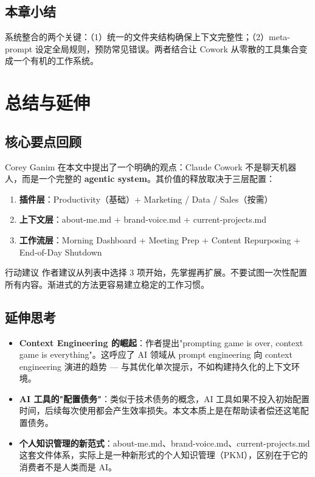 \documentclass[a4paper]{article}
\begin{document}
\subsection{本章小结}

系统整合的两个关键：（1）统一的文件夹结构确保上下文完整性；（2）meta-prompt 设定全局规则，预防常见错误。两者结合让 Cowork 从零散的工具集合变成一个有机的工作系统。

\section{总结与延伸}

\subsection{核心要点回顾}

Corey Ganim 在本文中提出了一个明确的观点：Claude Cowork 不是聊天机器人，而是一个完整的 \textbf{agentic system}。其价值的释放取决于三层配置：

\begin{enumerate}
    \item \textbf{插件层}：Productivity（基础）+ Marketing / Data / Sales（按需）
    \item \textbf{上下文层}：about-me.md + brand-voice.md + current-projects.md
    \item \textbf{工作流层}：Morning Dashboard + Meeting Prep + Content Repurposing + End-of-Day Shutdown
\end{enumerate}

\begin{importantbox}{行动建议}
作者建议从列表中选择 3 项开始，先掌握再扩展。不要试图一次性配置所有内容。渐进式的方法更容易建立稳定的工作习惯。
\end{importantbox}

\subsection{延伸思考}

\begin{itemize}
    \item \textbf{Context Engineering 的崛起}：作者提出"prompting game is over, context game is everything"。这呼应了 AI 领域从 prompt engineering 向 context engineering 演进的趋势 --- 与其优化单次提示，不如构建持久化的上下文环境。
    \item \textbf{AI 工具的"配置债务"}：类似于技术债务的概念，AI 工具如果不投入初始配置时间，后续每次使用都会产生效率损失。本文本质上是在帮助读者偿还这笔配置债务。
    \item \textbf{个人知识管理的新范式}：about-me.md、brand-voice.md、current-projects.md 这套文件体系，实际上是一种新形式的个人知识管理（PKM），区别在于它的消费者不是人类而是 AI。
\end{itemize}
\end{document}

